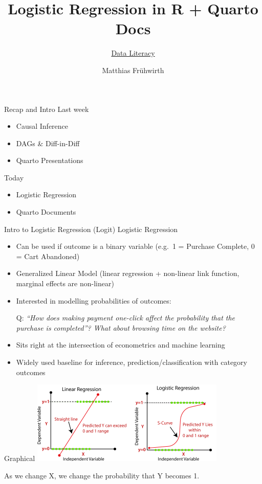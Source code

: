 \documentclass[
  10pt,
  ignorenonframetext,
]{beamer}
\title{Logistic Regression in R + Quarto Docs}
\subtitle{\href{./index.html}{Data Literacy}}
\author{Matthias Frühwirth}
\date{}
\institute{\href{https://www.wu.ac.at/retail/}{Institute for Retailing
\& Data Science}}
\providecommand{\tightlist}{%
  \setlength{\itemsep}{0pt}\setlength{\parskip}{0pt}}\usepackage{longtable,booktabs,array}
\begin{document}
\frame{\titlepage}


\begin{frame}{Recap and Intro}
\label{recap-and-intro}
Last week

\begin{itemize}
\tightlist
\item
  Causal Inference
\item
  DAGs \& Diff-in-Diff
\item
  Quarto Presentations
\end{itemize}

Today

\begin{itemize}
\tightlist
\item
  Logistic Regression
\item
  Quarto Documents
\end{itemize}
\end{frame}

\begin{frame}{Intro to Logistic Regression (Logit)}
\label{intro-to-logistic-regression-logit}
Logistic Regression

\begin{itemize}
\item
  Can be used if outcome is a binary variable (e.g.~1 = Purchase
  Complete, 0 = Cart Abandoned)
\item
  Generalized Linear Model (linear regression + non-linear link
  function, marginal effects are non-linear)
\item
  Interested in modelling probabilities of outcomes:

  Q: \emph{``How does making payment one-click affect the probability
  that the purchase is completed''? What about browsing time on the
  website?}
\item
  Sits right at the intersection of econometrics and machine learning
\item
  Widely used baseline for inference, prediction/classification with
  category outcomes
\end{itemize}
\end{frame}

\begin{frame}{Graphical}
\label{graphical}
\includegraphics[width=3.64583in,height=\textheight]{images/linear-regression-vs-logistic-regression.png}

As we change X, we change the probability that Y becomes 1.
\end{frame}
\end{document}

